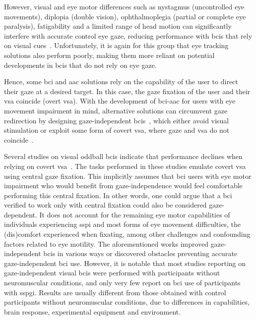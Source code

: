 \documentclass{article}
\begin{document}
However, visual and eye motor differences such as nystagmus (uncontrolled eye
movements), diplopia (double vision), ophthalmoplegia (partial or complete eye paralysis), fatigability and a limited range of head motion can significantly interfere with
accurate control eye gaze, reducing performance with \acp{bci} that rely on visual
cues~\cite{McCane2014,FriedOken2020,Pasqualotto2015,VanDenKerchove2024a}.
Unfortunately, it is again for this group that eye tracking solutions also
perform poorly, making them more reliant on potential developments in \acp{bci}
that do not rely on eye gaze.

Hence, some \ac{bci} and \ac{aac} solutions rely on the capability of the user
to direct their gaze at a desired target.
In this case, the gaze fixation of the user and their \ac{vsa}
coincide (overt \ac{vsa}).
With the development of \ac{bci}-\ac{aac} for users with eye movement impairment
in mind, alternative solutions can circumvent gaze redirection by
designing gaze-independent \acp{bci}~\cite{Riccio2012}, which either avoid visual stimulation
or exploit some form of covert \ac{vsa}, where gaze and \ac{vsa} do not
coincide~\cite{Aloise2012a,Zhang2010,Thiery2016,Pires2011,Egan2017}.

Several studies on visual oddball \acp{bci} indicate that performance declines
when relying on covert \ac{vsa}~\cite{Brunner2010, Treder2010, RonAngevin2019}.
The tasks performed in these studies emulate covert \ac{vsa}
using central gaze fixation.
This implicitly assumes that \ac{bci} users with eye motor impairment who would
benefit from gaze-independence would feel comfortable performing this central fixation.
In other words, one could argue that a \ac{bci} verified to work only with
central fixation could also be considered gaze-dependent.
It does not account for the remaining eye motor capabilities of individuals
experiencing \ac{sspi} and most forms of eye movement difficulties,
the (dis)comfort experienced when fixating,
among other challenges and confounding factors related to eye motility.
The aforementioned works improved gaze-independent \acp{bci}
in various ways or discovered obstacles preventing accurate gaze-independent \ac{bci} use.
However, it is notable that most studies reporting on gaze-independent visual \acp{bci}
were performed with participants without neuromuscular conditions, and only very
few report on \ac{bci} use of participants with \ac{sspgi}.
Results are usually different from those obtained with control
participants without neuromuscular conditions, due to differences in
capabilities, brain response, experimental equipment and environment.
\end{document}
